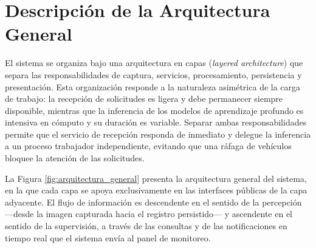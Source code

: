 \section{Descripción de la Arquitectura General}

El sistema se organiza bajo una arquitectura en capas (\textit{layered
architecture}) \cite{richards2020fundamentals} que separa las responsabilidades de captura, servicios,
procesamiento, persistencia y presentación. Esta organización responde a la
naturaleza asimétrica de la carga de trabajo: la recepción de solicitudes es
ligera y debe permanecer siempre disponible, mientras que la inferencia de los
modelos de aprendizaje profundo es intensiva en cómputo y su duración es
variable. Separar ambas responsabilidades permite que el servicio de recepción
responda de inmediato y delegue la inferencia a un proceso trabajador
independiente, evitando que una ráfaga de vehículos bloquee la atención de las
solicitudes.

La Figura \ref{fig:arquitectura_general} presenta la arquitectura general del
sistema, en la que cada capa se apoya exclusivamente en las interfaces públicas
de la capa adyacente. El flujo de información es descendente en el sentido de la
percepción ---desde la imagen capturada hacia el registro persistido--- y
ascendente en el sentido de la supervisión, a través de las consultas y de las
notificaciones en tiempo real que el sistema envía al panel de monitoreo.

